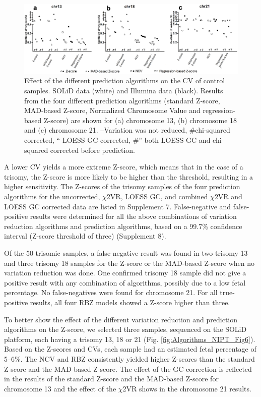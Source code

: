 \begin{figure}
	\includegraphics[width=1.0\linewidth]{img/Algorithms_NIPT_Fig5}
	\caption[Effect of the different prediction algorithms]{Effect of the different prediction algorithms on the CV of control samples. SOLiD data (white) and Illumina data (black). Results from the four different prediction algorithms (standard Z-score, MAD-based Z-score, Normalized Chromosome Value and regression-based Z-score) are shown for (a) chromosome 13, (b) chromosome 18 and (c) chromosome 21. –Variation was not reduced, \#chi-squared corrected, “ LOESS GC corrected, \#” both LOESS GC and chi-squared corrected before prediction.}
	\label{fig:Algorithms_NIPT_Fig5}
\end{figure}

A lower CV yields a more extreme Z-score, which means that in the case of a trisomy, the Z-score is more likely to be higher than the threshold, resulting in a higher sensitivity. 
The Z-scores of the trisomy samples of the four prediction algorithms for the uncorrected, $\chi$2VR, LOESS GC, and combined $\chi$2VR and LOESS GC corrected data are listed in Supplement 7. 
False-negative and false-positive results were determined for all the above combinations of variation reduction algorithms and prediction algorithms, based on a 99.7\% confidence interval (Z-score threshold of three) (Supplement 8).

Of the 50 trisomic samples, a false-negative result was found in two trisomy 13 and three trisomy 18 samples for the Z-score or the MAD-based Z-score when no variation reduction was done. 
One confirmed trisomy 18 sample did not give a positive result with any combination of algorithms, possibly due to a low fetal percentage. 
No false-negatives were found for chromosome 21. 
For all true-positive results, all four RBZ models showed a Z-score higher than three.

To better show the effect of the different variation reduction and prediction algorithms on the Z-score, we selected three samples, sequenced on the SOLiD platform, each having a trisomy 13, 18 or 21 (Fig. \ref{fig:Algorithms_NIPT_Fig6}). 
Based on the Z-scores and CVs, each sample had an estimated fetal percentage of 5–6\%. 
The NCV and RBZ consistently yielded higher Z-scores than the standard Z-score and the MAD-based Z-score. 
The effect of the GC-correction is reflected in the results of the standard Z-score and the MAD-based Z-score for chromosome 13 and the effect of the $\chi$2VR shows in the chromosome 21 results.

